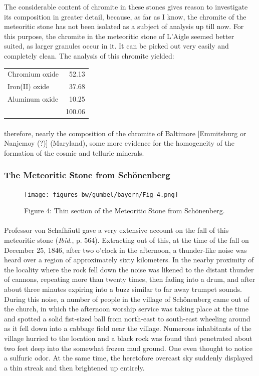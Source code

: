 \documentclass[a4paper, 12pt, oneside]{article}
\begin{document}
The considerable content of chromite in these stones gives reason to investigate its composition in greater detail, because, as far as I know, the chromite of the meteoritic stone has not been isolated as a subject of analysis up till now. For this purpose, the chromite in the meteoritic stone of L'Aigle seemed better suited, as larger granules occur in it. It can be picked out very easily and completely clean. The analysis of this chromite yielded:
\begin{center}
    \begin{tabular}{l r}
        Chromium oxide & 52.13\\
        Iron(II) oxide & 37.68\\
        Aluminum oxide & 10.25\\
         & 100.06\\
    \end{tabular}
\end{center}
\paragraph*{}
therefore, nearly the composition of the chromite of Baltimore [Emmitsburg or Nanjemoy (?)] (Maryland), some more evidence for the homogeneity of the formation of the cosmic and telluric minerals.
\clearpage
\subsubsection{The Meteoritic Stone from Schönenberg}
\begin{figure}[h]
\centering
\texttt{[image: figures-bw/gumbel/bayern/Fig-4.png]}
\caption{Figure 4: Thin section of the Meteoritic Stone from Schönenberg.}
\end{figure}
\paragraph*{}
Professor von Schafhäutl gave a very extensive account on the fall of this meteoritic stone (\emph{Ibid}., p. 564). Extracting out of this, at the time of the fall on December 25, 1846, after two o'clock in the afternoon, a thunder-like noise was heard over a region of approximately sixty kilometers. In the nearby proximity of the locality where the rock fell down the noise was likened to the distant thunder of cannons, repeating more than twenty times, then fading into a drum, and after about three minutes expiring into a buzz similar to far away trumpet sounds. During this noise, a number of people in the village of Schönenberg came out of the church, in which the afternoon worship service was taking place at the time and spotted a solid fist-sized ball from north-east to south-east wheeling around as it fell down into a cabbage field near the village. Numerous inhabitants of the village hurried to the location and a black rock was found that penetrated about two feet deep into the somewhat frozen mud ground. One even thought to notice a sulfuric odor. At the same time, the heretofore overcast sky suddenly displayed a thin streak and then brightened up entirely.
\end{document}
